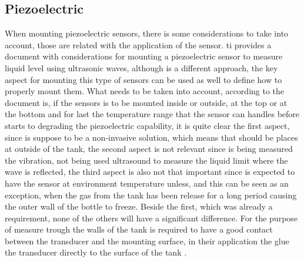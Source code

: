 \subsection{Piezoelectric}
When mounting piezoelectric sensors, there is some considerations to take into account, those are related with the application of the sensor. \acrshort{ti} provides a document with considerations for mounting a piezoelectric sensor to measure liquid level using ultrasonic waves, although is a different approach, the key aspect for mounting this type of sensors can be used as well to define how to properly mount them. What needs to be taken into account, according to the document is, if the sensors is to be mounted inside or outside, at the top or at the bottom and for last the temperature range that the sensor can handles before starts to degrading the piezoelectric capability, it is quite clear the first aspect, since is suppose to be a non-invasive solution, which means that should be places at outside of the tank, the second aspect is not relevant since is being measured the vibration, not being used ultrasound to measure the liquid limit where the wave is reflected, the third aspect is also not that important since is expected to have the sensor at environment temperature unless, and this can be seen as an exception, when the gas from the tank has been release for a long period causing the outer wall of the bottle to freeze. Beside the first, which was already a requirement, none of the others will have a significant difference. For the purpose of measure trough the walls of the tank is required to have a good contact between the transducer and the mounting surface, in their application the glue the transducer directly to the surface of the tank \cite{minasiHowSelectMount2015}.

